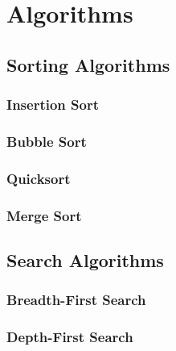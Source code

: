 \chapter{Algorithms}
\label{ch:algorithms}


\section{Sorting Algorithms}


\subsection{Insertion Sort}


\subsection{Bubble Sort}


\subsection{Quicksort}


\subsection{Merge Sort}


\section{Search Algorithms}


\subsection{Breadth-First Search}


\subsection{Depth-First Search}


